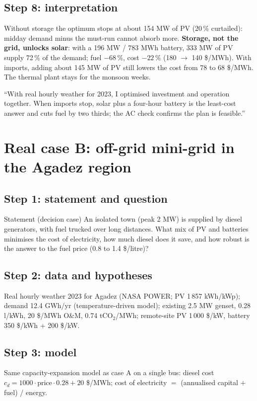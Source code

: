 \documentclass[11pt,a4paper]{article}
\begin{document}
\subsection{Step 8: interpretation}
Without storage the optimum stops at about 154 MW of PV (20\,\% curtailed): midday demand minus the must-run cannot absorb
more. \textbf{Storage, not the grid, unlocks solar}: with a 196 MW / 783 MWh battery, 333 MW of PV supply 72\,\% of the
demand; fuel $-68\,\%$, cost $-22\,\%$ (180 $\to$ 140 \$/MWh). With imports, adding about 145 MW of PV still lowers the cost
from 78 to 68 \$/MWh. The thermal plant stays for the monsoon weeks.
\begin{sayit}
``With real hourly weather for 2023, I optimised investment and operation together. When imports stop, solar plus a
four-hour battery is the least-cost answer and cuts fuel by two thirds; the AC check confirms the plan is feasible.''
\end{sayit}

\section{Real case B: off-grid mini-grid in the Agadez region}

\subsection{Step 1: statement and question}
\begin{gbox}{Statement (decision case)}
An isolated town (peak 2 MW) is supplied by diesel generators, with fuel trucked over long distances. What mix of PV and
batteries minimises the cost of electricity, how much diesel does it save, and how robust is the answer to the fuel price
(0.8 to 1.4 \$/litre)?
\end{gbox}

\subsection{Step 2: data and hypotheses}
Real hourly weather 2023 for Agadez (NASA POWER; PV 1\,857 kWh/kWp); demand 12.4 GWh/yr (temperature-driven model);
existing 2.5 MW genset, 0.28 l/kWh, 20 \$/MWh O\&M, 0.74 tCO$_2$/MWh; remote-site PV 1\,000 \$/kW, battery 350 \$/kWh + 200 \$/kW.

\subsection{Step 3: model}
Same capacity-expansion model as case A on a single bus: diesel cost $c_d = 1000\cdot\text{price}\cdot0.28 + 20$ \$/MWh;
cost of electricity $=$ (annualised capital $+$ fuel) / energy.
\end{document}
